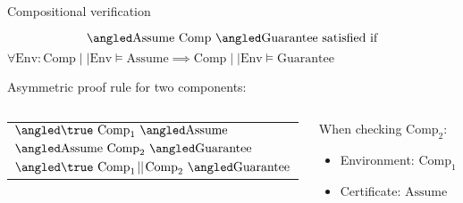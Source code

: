 \documentclass[../talk.tex]{subfiles}
\begin{document}
\begin{frame}{Compositional verification}
\begin{overlayarea}{\slidewidth}{\slideheight}
{                    \vspace*{-1em}
                    \[
                        \relyguarantee{\text{Assume}}{\text{Comp}}{\text{Guarantee}}
                        \text{ satisfied if}
                    \]
                        \(
                            \forall \text{Env} \colon \text{Comp} \!\mid\mid\! \text{Env} \models \text{Assume}
                            \implies
                            \text{Comp} \!\mid\mid\! \text{Env} \models \text{Guarantee}
                        \)


                    \vspace*{1em}

                    Asymmetric \alert{proof rule} for two components:

                    \begin{columns}[T]
                                \begin{column}{0.6\textwidth}
                                            \begin{tabular}{l}
                                                $\relyguarantee{\true}{\text{Comp}_1}{\text{Assume}}$
                                                \\
                                                $\relyguarantee{\text{Assume}}{\text{Comp}_2}{\text{Guarantee}}$
                                                \\
                                                \cline{1-1}
                                                $\relyguarantee{\true}{\text{Comp}_1 \!\mid\mid\! \text{Comp}_2 }{\text{Guarantee}}$
                                                \\
                                            \end{tabular}
                                \end{column}
                                    \begin{column}{0.4\textwidth}
                                        When checking $\text{Comp}_2$:
                                        \begin{itemize}
                                            \item[] \alert{Environment}: $\text{Comp}_1$
                                            \item[] \alert{Certificate}: $\text{Assume}$
                                        \end{itemize}
                                    \end{column}
                            \end{columns}
            }
    \end{overlayarea}
\end{frame}
\end{document}
